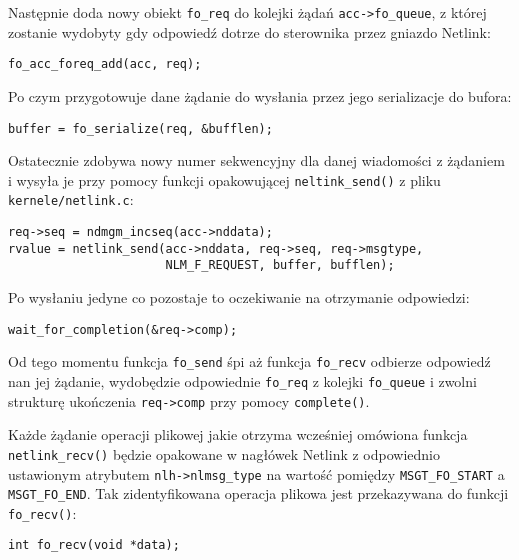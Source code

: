 \documentclass[10pt]{article}
\begin{document}
Następnie doda nowy obiekt \texttt{fo\_req} do kolejki żądań \texttt{acc-\textgreater{}fo\_queue}, z której zostanie wydobyty gdy odpowiedź dotrze do sterownika przez gniazdo Netlink:

\begin{verbatim}
fo_acc_foreq_add(acc, req);
\end{verbatim}

Po czym przygotowuje dane żądanie do wysłania przez jego serializacje do bufora:

\begin{verbatim}
buffer = fo_serialize(req, &bufflen);
\end{verbatim}

Ostatecznie zdobywa nowy numer sekwencyjny dla danej wiadomości z żądaniem i wysyła je przy pomocy funkcji opakowującej \texttt{neltink\_send()} z pliku \texttt{kernele/netlink.c}:

\begin{verbatim}
req->seq = ndmgm_incseq(acc->nddata);
rvalue = netlink_send(acc->nddata, req->seq, req->msgtype,
                      NLM_F_REQUEST, buffer, bufflen);
\end{verbatim}

Po wysłaniu jedyne co pozostaje to oczekiwanie na otrzymanie odpowiedzi:

\begin{verbatim}
wait_for_completion(&req->comp);
\end{verbatim}

Od tego momentu funkcja \texttt{fo\_send} śpi aż funkcja \texttt{fo\_recv} odbierze odpowiedź nan jej żądanie, wydobędzie odpowiednie \texttt{fo\_req} z kolejki \texttt{fo\_queue} i zwolni strukturę ukończenia \texttt{req-\textgreater{}comp} przy pomocy \texttt{complete()}.


Każde żądanie operacji plikowej jakie otrzyma wcześniej omówiona funkcja \texttt{netlink\_recv()} będzie opakowane w nagłówek Netlink z odpowiednio ustawionym atrybutem \texttt{nlh-\textgreater{}nlmsg\_type} na wartość pomiędzy \texttt{MSGT\_FO\_START} a \texttt{MSGT\_FO\_END}.  Tak zidentyfikowana operacja plikowa jest przekazywana do funkcji \texttt{fo\_recv()}:

\begin{verbatim}
int fo_recv(void *data);
\end{verbatim}
\end{document}
